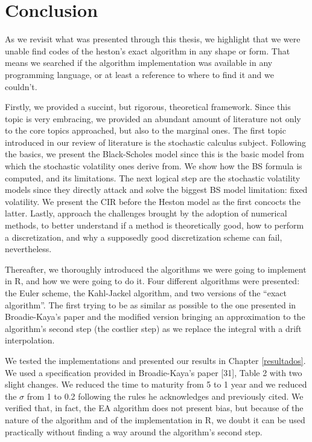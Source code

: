 \documentclass[12pt,oneside]{reedthesis}
\theoremstyle{definition}
\theoremstyle{definition}
\theoremstyle{remark}
\begin{document}
  \chapter{Conclusion}\label{conclusao}
  
  As we revisit what was presented through this thesis, we highlight that
  we were unable find codes of the heston's exact algorithm in any shape
  or form. That means we searched if the algorithm implementation was
  available in any programming language, or at least a reference to where
  to find it and we couldn't.
  
  Firstly, we provided a succint, but rigorous, theoretical framework.
  Since this topic is very embracing, we provided an abundant amount of
  literature not only to the core topics approached, but also to the
  marginal ones. The first topic introduced in our review of literature is
  the stochastic calculus subject. Following the basics, we present the
  Black-Scholes model since this is the basic model from which the
  stochastic volatility ones derive from. We show how the BS formula is
  computed, and its limitations. The next logical step are the stochastic
  volatility models since they directly attack and solve the biggest BS
  model limitation: fixed volatility. We present the CIR before the Heston
  model as the first concocts the latter. Lastly, approach the challenges
  brought by the adoption of numerical methods, to better understand if a
  method is theoretically good, how to perform a discretization, and why a
  supposedly good discretization scheme can fail, nevertheless.
  
  Thereafter, we thoroughly introduced the algorithms we were going to
  implement in R, and how we were going to do it. Four different
  algorithms were presented: the Euler scheme, the Kahl-Jackel algorithm,
  and two versions of the ``exact algorithm''. The first trying to be as
  similar as possible to the one presented in Broadie-Kaya's paper and the
  modified version bringing an approximation to the algorithm's second
  step (the costlier step) as we replace the integral with a drift
  interpolation.
  
  We tested the implementations and presented our results in Chapter
  \ref{resultados}. We used a specification provided in Broadie-Kaya's
  paper {[}31{]}, Table 2 with two slight changes. We reduced the time to
  maturity from 5 to 1 year and we reduced the \(\sigma\) from 1 to 0.2
  following the rules he acknowledges and previously cited. We verified
  that, in fact, the EA algorithm does not present bias, but because of
  the nature of the algorithm and of the implementation in R, we doubt it
  can be used practically without finding a way around the algorithm's
  second step.
  
\end{document}
